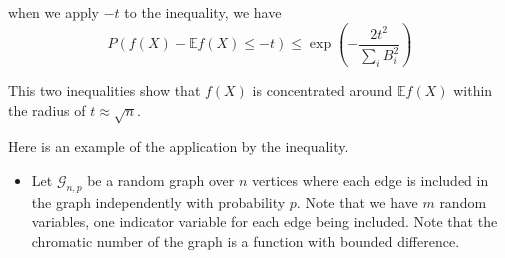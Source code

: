 when we apply $-t$ to the inequality, we have 
\begin{equation}
    P(f(X)-\mathbb{E} f(X) \leq -t) \leq  \exp \left(-\frac{2 t^{2}}{\sum_{i} B_{i}^{2}}\right)
\end{equation}

This two inequalities show that $f(X)$ is concentrated around $\mathbb{E}f(X)$ within the radius of $t \approx \sqrt{n}$.

Here is an example of the application by the inequality.

\begin{itemize}
    \item Let $\mathcal{G}_{n,p}$ be a random graph over $n$ vertices where each edge is included in the graph independently 
    with probability $p$. Note that we have $m$ random variables, one indicator variable for each edge being included. 
    Note that the chromatic number of the graph is a function with bounded difference. \cite*{hmaji:2017}
\end{itemize}
